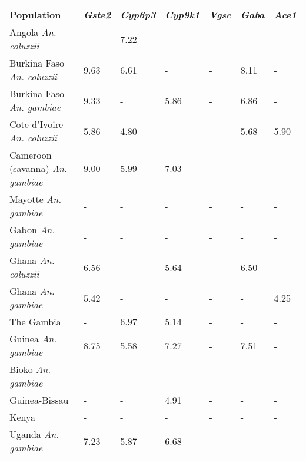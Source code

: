 \begin{tabular}{lllllll}
\toprule
                              Population & \textit{Gste2} & \textit{Cyp6p3} & \textit{Cyp9k1} & \textit{Vgsc} & \textit{Gaba} & \textit{Ace1} \\
\midrule
            Angola \textit{An. coluzzii} &              - &            7.22 &               - &             - &             - &             - \\
      Burkina Faso \textit{An. coluzzii} &           9.63 &            6.61 &               - &             - &          8.11 &             - \\
       Burkina Faso \textit{An. gambiae} &           9.33 &               - &            5.86 &             - &          6.86 &             - \\
     Cote d'Ivoire \textit{An. coluzzii} &           5.86 &            4.80 &               - &             - &          5.68 &          5.90 \\
 Cameroon (savanna) \textit{An. gambiae} &           9.00 &            5.99 &            7.03 &             - &             - &             - \\
            Mayotte \textit{An. gambiae} &              - &               - &               - &             - &             - &             - \\
              Gabon \textit{An. gambiae} &              - &               - &               - &             - &             - &             - \\
             Ghana \textit{An. coluzzii} &           6.56 &               - &            5.64 &             - &          6.50 &             - \\
              Ghana \textit{An. gambiae} &           5.42 &               - &               - &             - &             - &          4.25 \\
                              The Gambia &              - &            6.97 &            5.14 &             - &             - &             - \\
             Guinea \textit{An. gambiae} &           8.75 &            5.58 &            7.27 &             - &          7.51 &             - \\
              Bioko \textit{An. gambiae} &              - &               - &               - &             - &             - &             - \\
                           Guinea-Bissau &              - &               - &            4.91 &             - &             - &             - \\
                                   Kenya &              - &               - &               - &             - &             - &             - \\
             Uganda \textit{An. gambiae} &           7.23 &            5.87 &            6.68 &             - &             - &             - \\
\bottomrule
\end{tabular}
